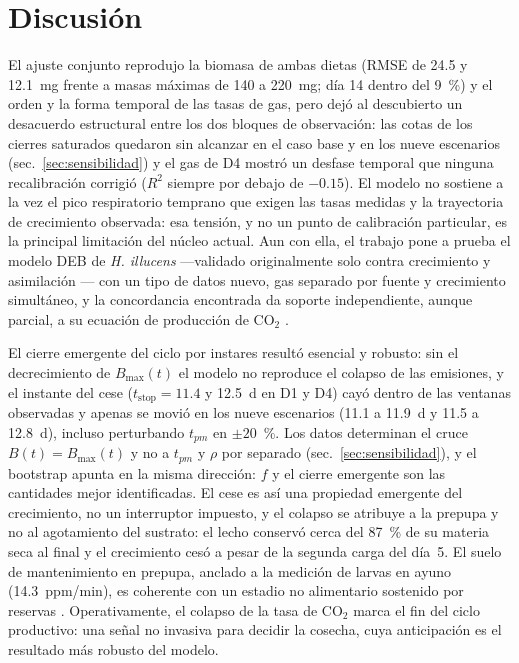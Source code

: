 \section{Discusión}
\label{sec:discusión}

El ajuste conjunto reprodujo la biomasa de ambas dietas (RMSE de 24.5 y 12.1~mg frente a masas máximas de 140 a 220~mg; día 14 dentro del 9~\%) y el orden y la forma temporal de las tasas de gas, pero dejó al descubierto un desacuerdo estructural entre los dos bloques de observación: las cotas de los cierres saturados quedaron sin alcanzar en el caso base y en los nueve escenarios (sec.~\ref{sec:sensibilidad}) y el gas de D4 mostró un desfase temporal que ninguna recalibración corrigió ($R^2$ siempre por debajo de $-0.15$). El modelo no sostiene a la vez el pico respiratorio temprano que exigen las tasas medidas y la trayectoria de crecimiento observada: esa tensión, y no un punto de calibración particular, es la principal limitación del núcleo actual. Aun con ella, el trabajo pone a prueba el modelo DEB de \textit{H. illucens} ---validado originalmente solo contra crecimiento y asimilación \parencite{eriksenDynamicModellingFeed2022}--- con un tipo de datos nuevo, gas separado por fuente y crecimiento simultáneo, y la concordancia encontrada da soporte independiente, aunque parcial, a su ecuación de producción de CO$_2$ \parencite{eriksenDynamicModellingFeed2022,eriksenMetabolicPerformanceFeed2024}.

El cierre emergente del ciclo por instares resultó esencial y robusto: sin el decrecimiento de $B_{\max}(t)$ el modelo no reproduce el colapso de las emisiones, y el instante del cese ($t_{\mathrm{stop}} = 11.4$ y 12.5~d en D1 y D4) cayó dentro de las ventanas observadas y apenas se movió en los nueve escenarios (11.1 a 11.9~d y 11.5 a 12.8~d), incluso perturbando $t_{pm}$ en $\pm 20$~\%. Los datos determinan el cruce $B(t) = B_{\max}(t)$ y no a $t_{pm}$ y $\rho$ por separado (sec.~\ref{sec:sensibilidad}), y el bootstrap apunta en la misma dirección: $f$ y el cierre emergente son las cantidades mejor identificadas. El cese es así una propiedad emergente del crecimiento, no un interruptor impuesto, y el colapso se atribuye a la prepupa y no al agotamiento del sustrato: el lecho conservó cerca del 87~\% de su materia seca al final y el crecimiento cesó a pesar de la segunda carga del día~5. El suelo de mantenimiento en prepupa, anclado a la medición de larvas en ayuno (14.3~ppm/min), es coherente con un estadio no alimentario sostenido por reservas \parencite{arreseInsectFatBody2010,llandresDynamicEnergyBudget2015}. Operativamente, el colapso de la tasa de CO$_2$ marca el fin del ciclo productivo: una señal no invasiva para decidir la cosecha, cuya anticipación es el resultado más robusto del modelo.


